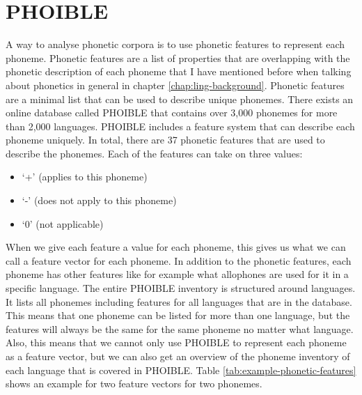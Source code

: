 \section{PHOIBLE}
\label{sec:phoible}
A way to analyse phonetic corpora is to use phonetic features to represent each phoneme. Phonetic features are a list of properties that are overlapping with the phonetic description of each phoneme that I have mentioned before when talking about phonetics in general in chapter \ref{chap:ling-background}. Phonetic features are a minimal list that can be used to describe unique phonemes. There exists an online database called PHOIBLE \citep{phoible} that contains over 3,000 phonemes for more than 2,000 languages. PHOIBLE includes a feature system that can describe each phoneme uniquely. In total, there are 37 phonetic features that are used to describe the phonemes. Each of the features can take on three values:
\begin{itemize}
    \item `+' (applies to this phoneme)
    \item `-' (does not apply to this phoneme)
    \item `0' (not applicable)
\end{itemize}
When we give each feature a value for each phoneme, this gives us what we can call a feature vector for each phoneme. In addition to the phonetic features, each phoneme has other features like for example what allophones are used for it in a specific language. The entire PHOIBLE inventory is structured around languages. It lists all phonemes including features for all languages that are in the database. This means that one phoneme can be listed for more than one language, but the features will always be the same for the same phoneme no matter what language. Also, this means that we cannot only use PHOIBLE to represent each phoneme as a feature vector, but we can also get an overview of the phoneme inventory of each language that is covered in PHOIBLE. Table \ref{tab:example-phonetic-features} shows an example for two feature vectors for two phonemes.

